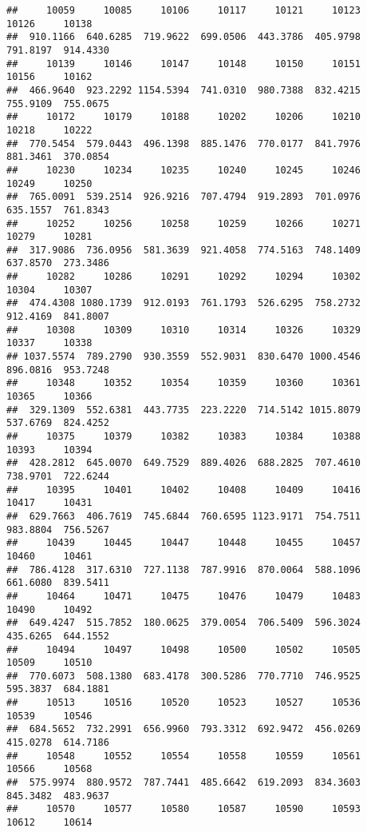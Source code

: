 \documentclass[
]{article}
\begin{document}
\begin{verbatim}
##     10059     10085     10106     10117     10121     10123     10126     10138 
##  910.1166  640.6285  719.9622  699.0506  443.3786  405.9798  791.8197  914.4330 
##     10139     10146     10147     10148     10150     10151     10156     10162 
##  466.9640  923.2292 1154.5394  741.0310  980.7388  832.4215  755.9109  755.0675 
##     10172     10179     10188     10202     10206     10210     10218     10222 
##  770.5454  579.0443  496.1398  885.1476  770.0177  841.7976  881.3461  370.0854 
##     10230     10234     10235     10240     10245     10246     10249     10250 
##  765.0091  539.2514  926.9216  707.4794  919.2893  701.0976  635.1557  761.8343 
##     10252     10256     10258     10259     10266     10271     10279     10281 
##  317.9086  736.0956  581.3639  921.4058  774.5163  748.1409  637.8570  273.3486 
##     10282     10286     10291     10292     10294     10302     10304     10307 
##  474.4308 1080.1739  912.0193  761.1793  526.6295  758.2732  912.4169  841.8007 
##     10308     10309     10310     10314     10326     10329     10337     10338 
## 1037.5574  789.2790  930.3559  552.9031  830.6470 1000.4546  896.0816  953.7248 
##     10348     10352     10354     10359     10360     10361     10365     10366 
##  329.1309  552.6381  443.7735  223.2220  714.5142 1015.8079  537.6769  824.4252 
##     10375     10379     10382     10383     10384     10388     10393     10394 
##  428.2812  645.0070  649.7529  889.4026  688.2825  707.4610  738.9701  722.6244 
##     10395     10401     10402     10408     10409     10416     10417     10431 
##  629.7663  406.7619  745.6844  760.6595 1123.9171  754.7511  983.8804  756.5267 
##     10439     10445     10447     10448     10455     10457     10460     10461 
##  786.4128  317.6310  727.1138  787.9916  870.0064  588.1096  661.6080  839.5411 
##     10464     10471     10475     10476     10479     10483     10490     10492 
##  649.4247  515.7852  180.0625  379.0054  706.5409  596.3024  435.6265  644.1552 
##     10494     10497     10498     10500     10502     10505     10509     10510 
##  770.6073  508.1380  683.4178  300.5286  770.7710  746.9525  595.3837  684.1881 
##     10513     10516     10520     10523     10527     10536     10539     10546 
##  684.5652  732.2991  656.9960  793.3312  692.9472  456.0269  415.0278  614.7186 
##     10548     10552     10554     10558     10559     10561     10566     10568 
##  575.9974  880.9572  787.7441  485.6642  619.2093  834.3603  845.3482  483.9637 
##     10570     10577     10580     10587     10590     10593     10612     10614 

\end{verbatim}
\end{document}

